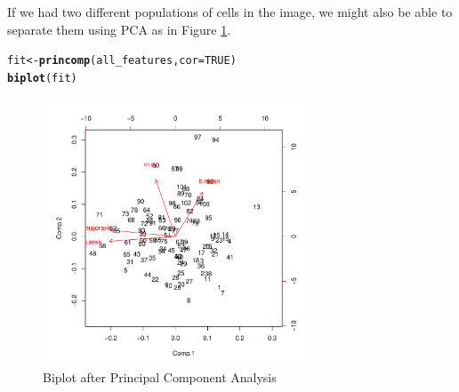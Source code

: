 \documentclass{article}\usepackage[]{graphicx}\usepackage[]{color}
\makeatletter
\newcommand{\hlnum}[1]{\textcolor[rgb]{0.686,0.059,0.569}{#1}}%
\newcommand{\hlstd}[1]{\textcolor[rgb]{0.345,0.345,0.345}{#1}}%
\newcommand{\hlkwb}[1]{\textcolor[rgb]{0.69,0.353,0.396}{#1}}%
\newcommand{\hlkwc}[1]{\textcolor[rgb]{0.333,0.667,0.333}{#1}}%
\newcommand{\hlkwd}[1]{\textcolor[rgb]{0.737,0.353,0.396}{\textbf{#1}}}%
\newenvironment{kframe}{%
 \def\at@end@of@kframe{}%
 \ifinner\ifhmode%
  \def\at@end@of@kframe{\end{minipage}}%
  \begin{minipage}{\columnwidth}%
 \fi\fi%
 \def\FrameCommand##1{\hskip\@totalleftmargin \hskip-\fboxsep
 \colorbox{shadecolor}{##1}\hskip-\fboxsep
     \hskip-\linewidth \hskip-\@totalleftmargin \hskip\columnwidth}%
 \MakeFramed {\advance\hsize-\width
   \@totalleftmargin\z@ \linewidth\hsize
   \@setminipage}}%
 {\par\unskip\endMakeFramed%
 \at@end@of@kframe}
\newenvironment{knitrout}{}{} %
\makeatother
\begin{document}
If we had two different populations of cells in the image, we might also be able to separate them using PCA as in Figure \ref{fig:pca}.
\begin{knitrout}
\color{fgcolor}\begin{kframe}
\begin{alltt}
\hlstd{fit} \hlkwb{<-} \hlkwd{princomp}\hlstd{(all_features,} \hlkwc{cor}\hlstd{=}\hlnum{TRUE}\hlstd{)}
\hlkwd{biplot}\hlstd{(fit)}
\end{alltt}
\end{kframe}\begin{figure}

{\centering \includegraphics[width=300px]{knit_figure/figpca-1} 

}

\caption[Biplot after Principal Component Analysis]{Biplot after Principal Component Analysis\label{fig:pca}}
\end{figure}


\end{knitrout}
\end{document}
